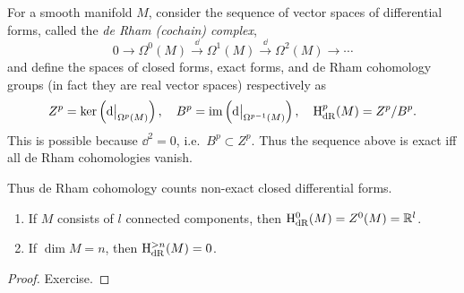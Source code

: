 \begin{defn}
    For a smooth manifold $M$, consider the sequence of vector spaces of differential forms, called the \emph{de Rham (cochain) complex},
    \[0\to\Omega^0(M)\overset\dd\to\Omega^1(M)\overset\dd\to\Omega^2(M)\to\cdots\]
    and define the spaces of closed forms, exact forms, and de Rham cohomology groups (in fact they are real vector spaces) respectively as
    \[Z^p=\ker\left(\restr{\dd}{\Omega^p(M)}\right),\quad B^p=\im\left(\restr{\dd}{\Omega^{p-1}(M)}\right),\quad \rmH_{\rm dR}^p(M)=Z^p/B^p.\]
    This is possible because $\dd^2=0$, i.e.\ $B^p\subset Z^p$.
    Thus the sequence above is exact iff all de Rham cohomologies vanish.
\end{defn}
Thus de Rham cohomology counts non-exact closed differential forms.

\begin{prop}\label{prop zeroth cohomology}
    \begin{enumerate}
    \item If $M$ consists of $l$ connected components, then $\mathrm{H}_{\rm dR}^0(M)=Z^0(M)=\mathbb{R}^l$.
    \item If $\dim M=n$, then $\mathrm{H}_{\rm dR}^{> n}(M)=0$.
\end{enumerate}
\end{prop}
\begin{proof}
    Exercise.
\end{proof}

